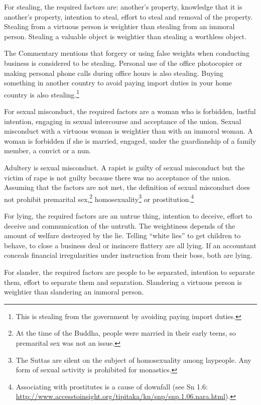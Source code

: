 For stealing, the required factors are: another’s property, knowledge that it is another’s property, intention to steal, effort to steal and removal of the property. Stealing from a virtuous person is weightier than stealing from an immoral person. Stealing a valuable object is weightier than stealing a worthless object.

The Commentary mentions that forgery or using false weights when conducting business is considered to be stealing. Personal use of the office photocopier or making personal phone calls during office hours is also stealing. Buying something in another country to avoid paying import duties in your home country is also stealing.\footnote{This is stealing from the government by avoiding paying import duties.}

For sexual misconduct, the required factors are a woman who is forbidden, lustful intention, engaging in sexual intercourse and acceptance of the union. Sexual misconduct with a virtuous woman is weightier than with an immoral woman. A woman is forbidden if she is married, engaged, under the guardianship of a family member, a convict or a nun.

Adultery is sexual misconduct. A rapist is guilty of sexual misconduct but the victim of rape is not guilty because there was no acceptance of the union. Assuming that the factors are not met, the definition of sexual misconduct does not prohibit premarital sex,\footnote{At the time of the Buddha, people were married in their early teens, so premarital sex was not an issue.} homosexuality\footnote{The Suttas are silent on the subject of homosexuality among laypeople. Any form of sexual activity is prohibited for monastics.} or prostitution.\footnote{Associating with prostitutes is a cause of downfall (see Sn 1.6: \url{http://www.accesstoinsight.org/tipitaka/kn/snp/snp.1.06.nara.html}).}

For lying, the required factors are an untrue thing, intention to deceive, effort to deceive and communication of the untruth. The weightiness depends of the amount of welfare destroyed by the lie. Telling “white lies” to get children to behave, to close a business deal or insincere flattery are all lying. If an accountant conceals financial irregularities under instruction from their boss, both are lying.

For slander, the required factors are people to be separated, intention to separate them, effort to separate them and separation. Slandering a virtuous person is weightier than slandering an immoral person.

